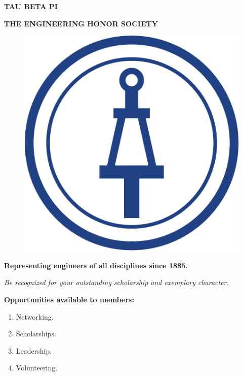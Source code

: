 \documentclass[14pt]{extarticle}
\begin{document}
\begin{center}
{\fontsize{42}{0}  \textbf{TAU BETA PI}}

{\fontsize{13}{0} \textbf{THE ENGINEERING HONOR SOCIETY}}
\end{center}


\begin{figure}[h]
    \includegraphics[scale=0.7]{tbp-logo.png}
    \centering
\end{figure}

\begin{center}
    \textbf{Representing engineers of all disciplines since 1885.}
\end{center}

\begin{center}
{\Large \emph{Be recognized for your outstanding scholarship and exemplary character.}}
\end{center}

\bigskip
{\large \textbf{Opportunities available to members:}}

\begin{multicols}{2}
\begin{enumerate}
    \item Networking.
    \item Scholarships.
    \item Leadership.
    \item Volunteering.
\end{enumerate}
\end{multicols}
\end{document}
